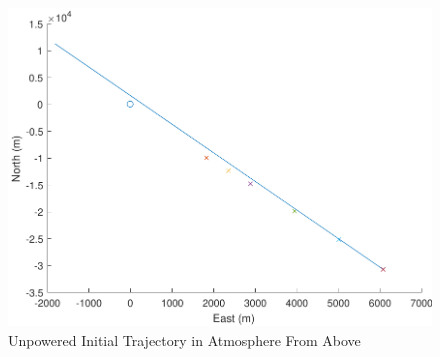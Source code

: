 \begin{figure}[H]
	\centering
	\begin{minipage}{4.5 in}
		\includegraphics[width=\linewidth]{Figures/trajunpowatmo_2.pdf}
		\caption{Unpowered Initial Trajectory in Atmosphere From Above \label{fig:trajunpowatmo_2} }
	\end{minipage}
\end{figure}


